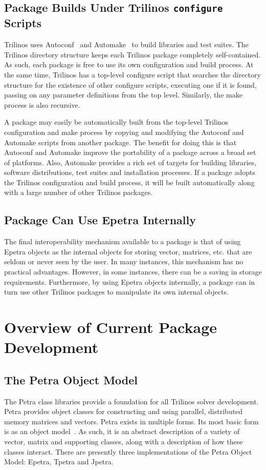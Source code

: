 \documentclass[12pt,strict]{SANDreport}
\begin{document}
\subsection{Package Builds Under Trilinos {\tt configure} Scripts}
Trilinos uses Autoconf~\cite{Autoconf} and Automake~\cite{Automake} to
build libraries and test suites.  The Trilinos directory structure
keeps each Trilinos package completely self-contained.  As such, each
package is free to use its own configuration and build process.  At
the same time, Trilinos has a top-level configure script that searches
the directory structure for the existence of other configure scripts,
executing one if it is found, passing on any parameter definitions
from the top level.  Similarly, the make process is also recursive.

A package may easily be automatically built from the top-level
Trilinos configuration and make process by copying and modifying the
Autoconf and Automake scripts from another package.  The benefit for
doing this is that Autoconf and Automake improve the portability of a
package across a broad set of platforms.  Also, Automake provides a
rich set of targets for building libraries, software distributions,
test suites and installation processes.  If a package adopts the
Trilinos configuration and build process, it will be built
automatically along with a large number of other Trilinos packages.

\subsection{Package Can Use Epetra Internally}

The final interoperability mechanism available to a package is that of
using Epetra objects as the
internal objects for storing vector, matrices, etc. that are seldom or
never seen by the user.  In many instances, this mechanism has no
practical advantages.  However, in some instances, there can be a
saving in storage requirements.  Furthermore, by using Epetra objects
internally, a package can in turn use other Trilinos packages to
manipulate its own internal objects.

\section{Overview of Current Package Development}

\subsection{The Petra Object Model}
\label{subsect:PetraObjectModel}
The Petra class libraries provide a
foundation for all Trilinos solver development.  Petra provides object classes for
constructing and using parallel, distributed memory matrices and vectors.  Petra exists in
multiple forms.  Its most basic form is as an object model~\cite{HeroHoekWill2002}.
As such, it is an abstract 
description of a variety of vector, matrix and supporting classes, along with a description of
how these classes interact.  There are presently three implementations
of the Petra Object Model: Epetra, Tpetra and Jpetra.
\end{document}
